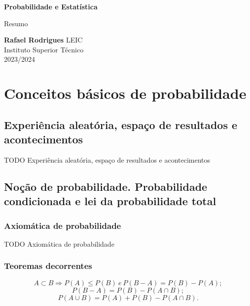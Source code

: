 \documentclass[11pt, a4paper]{article}
\begin{document}
\begin{titlepage}
    \begin{center}
        \vspace*{1cm}

        \textbf{\LARGE Probabilidade e Estatística}
        \vspace{0.5cm}

        \Large Resumo
        \vspace{1.5cm}

        \textbf{Rafael Rodrigues}
        \vfill
        LEIC \\
        Instituto Superior Técnico \\
        2023/2024
    \end{center}
\end{titlepage}

\tableofcontents

\setcounter{section}{1}

\newpage
\section{Conceitos básicos de probabilidade}


\subsection{Experiência aleatória, espaço de resultados e acontecimentos}

TODO Experiência aleatória, espaço de resultados e acontecimentos

\subsection{Noção de probabilidade. Probabilidade condicionada e lei da probabilidade total}

\subsubsection*{Axiomática de probabilidade}

TODO Axiomática de probabilidade

\subsubsection*{Teoremas decorrentes}

\begin{equation*}
    A \subset  B \Rightarrow P(A) \leq P(B) \ e \ P(B - A) = P(B) - P(A);
\end{equation*}
\begin{equation*}
    P(B - A) = P(B) - P(A \cap B);
\end{equation*}
\begin{equation*}
    P(A \cup B) = P(A) + P(B) - P(A \cap B).
\end{equation*}
\end{document}
